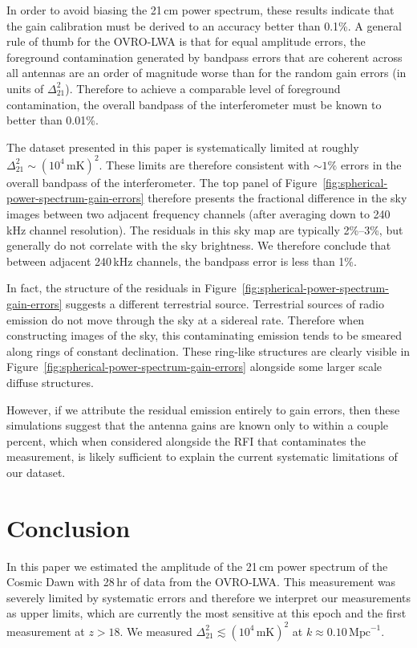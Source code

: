 \documentclass[twocolumn]{aastex62}
\begin{document}
In order to avoid biasing the 21\,cm power spectrum, these results indicate that the gain
calibration must be derived to an accuracy better than 0.1\%.  A general rule of thumb for the
OVRO-LWA is that for equal amplitude errors, the foreground contamination generated by bandpass
errors that are coherent across all antennas are an order of magnitude worse than for the random
gain errors (in units of $\Delta_{21}^2$). Therefore to achieve a comparable level of foreground
contamination, the overall bandpass of the interferometer must be known to better than 0.01\%.

The dataset presented in this paper is systematically limited at roughly $\Delta_{21}^2 \sim
(10^4\,\text{mK})^2$. These limits are therefore consistent with $\sim 1\%$ errors in the overall
bandpass of the interferometer. The top panel of
Figure~\ref{fig:spherical-power-spectrum-gain-errors} therefore presents the fractional difference
in the sky images between two adjacent frequency channels (after averaging down to 240\,kHz channel
resolution). The residuals in this sky map are typically 2\%--3\%, but generally do not correlate
with the sky brightness. We therefore conclude that between adjacent 240\,kHz channels, the bandpass
error is less than 1\%.

In fact, the structure of the residuals in Figure~\ref{fig:spherical-power-spectrum-gain-errors}
suggests a different terrestrial source. Terrestrial sources of radio emission do not move through
the sky at a sidereal rate. Therefore when constructing images of the sky, this contaminating
emission tends to be smeared along rings of constant declination. These ring-like structures are
clearly visible in Figure~\ref{fig:spherical-power-spectrum-gain-errors} alongside some larger scale
diffuse structures.

However, if we attribute the residual emission entirely to gain errors, then these simulations
suggest that the antenna gains are known only to within a couple percent, which when considered
alongside the RFI that contaminates the measurement, is likely sufficient to explain the current
systematic limitations of our dataset.

\section{Conclusion}\label{sec:conclusion}

In this paper we estimated the amplitude of the 21\,cm power spectrum of the Cosmic Dawn with 28\,hr
of data from the OVRO-LWA. This measurement was severely limited by systematic errors and therefore
we interpret our measurements as upper limits, which are currently the most sensitive at this epoch
and the first measurement at $z > 18$. We measured $\Delta_{21}^2 \lesssim (10^4\,\text{mK})^2$ at
$k \approx 0.10\,\text{Mpc}^{-1}$.
\end{document}
